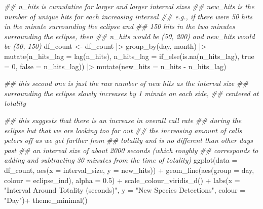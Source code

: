 \documentclass[
  letterpaper,
  DIV=11,
  numbers=noendperiod]{scrartcl}
\newenvironment{Shaded}{\begin{snugshade}}{\end{snugshade}}
\newcommand{\AttributeTok}[1]{\textcolor[rgb]{0.40,0.45,0.13}{#1}}
\newcommand{\DecValTok}[1]{\textcolor[rgb]{0.68,0.00,0.00}{#1}}
\newcommand{\DocumentationTok}[1]{\textcolor[rgb]{0.37,0.37,0.37}{\textit{#1}}}
\newcommand{\FloatTok}[1]{\textcolor[rgb]{0.68,0.00,0.00}{#1}}
\newcommand{\FunctionTok}[1]{\textcolor[rgb]{0.28,0.35,0.67}{#1}}
\newcommand{\NormalTok}[1]{\textcolor[rgb]{0.00,0.23,0.31}{#1}}
\newcommand{\OtherTok}[1]{\textcolor[rgb]{0.00,0.23,0.31}{#1}}
\newcommand{\SpecialCharTok}[1]{\textcolor[rgb]{0.37,0.37,0.37}{#1}}
\newcommand{\StringTok}[1]{\textcolor[rgb]{0.13,0.47,0.30}{#1}}
\begin{document}
\begin{Shaded}
\begin{Highlighting}[]
\DocumentationTok{\#\# n\_hits is cumulative for larger and larger interval sizes}
\DocumentationTok{\#\# new\_hits is the number of unique hits for each increasing interval }
\DocumentationTok{\#\# e.g., if there were 50 hits in the minute surrounding the eclipse and }
\DocumentationTok{\#\# 150 hits in the two minutes surrounding the eclipse, then}
\DocumentationTok{\#\# n\_hits would be (50, 200) and new\_hits would be (50, 150)}
\NormalTok{df\_count }\OtherTok{\textless{}{-}}\NormalTok{ df\_count }\SpecialCharTok{|\textgreater{}} \FunctionTok{group\_by}\NormalTok{(day, month) }\SpecialCharTok{|\textgreater{}}
  \FunctionTok{mutate}\NormalTok{(}\AttributeTok{n\_hits\_lag =} \FunctionTok{lag}\NormalTok{(n\_hits),}
         \AttributeTok{n\_hits\_lag =} \FunctionTok{if\_else}\NormalTok{(}\FunctionTok{is.na}\NormalTok{(n\_hits\_lag), }\AttributeTok{true =} \DecValTok{0}\NormalTok{, }\AttributeTok{false =}\NormalTok{ n\_hits\_lag)) }\SpecialCharTok{|\textgreater{}}
  \FunctionTok{mutate}\NormalTok{(}\AttributeTok{new\_hits =}\NormalTok{ n\_hits }\SpecialCharTok{{-}}\NormalTok{ n\_hits\_lag)}

\DocumentationTok{\#\# this second one is just the raw number of new hits as the interval size}
\DocumentationTok{\#\# surrounding the eclipse slowly increases by 1 minute on each side,}
\DocumentationTok{\#\# centered at totality}

\DocumentationTok{\#\# this suggests that there is an increase in overall call rate}
\DocumentationTok{\#\# during the eclipse but that we are looking too far out}
\DocumentationTok{\#\# the increasing amount of calls peters off as we get further from }
\DocumentationTok{\#\# totality and is no different than other days past}
\DocumentationTok{\#\# an interval size of about 2000 seconds (which roughly }
\DocumentationTok{\#\# corresponds to adding and subtracting 30 minutes from the time of totality)}
\FunctionTok{ggplot}\NormalTok{(}\AttributeTok{data =}\NormalTok{ df\_count, }\FunctionTok{aes}\NormalTok{(}\AttributeTok{x =}\NormalTok{ interval\_size, }\AttributeTok{y =}\NormalTok{ new\_hits)) }\SpecialCharTok{+}
  \FunctionTok{geom\_line}\NormalTok{(}\FunctionTok{aes}\NormalTok{(}\AttributeTok{group =}\NormalTok{ day, }\AttributeTok{colour =}\NormalTok{ eclipse\_ind), }\AttributeTok{alpha =} \FloatTok{0.5}\NormalTok{) }\SpecialCharTok{+}
  \FunctionTok{scale\_colour\_viridis\_d}\NormalTok{() }\SpecialCharTok{+}
  \FunctionTok{labs}\NormalTok{(}\AttributeTok{x =} \StringTok{"Interval Around Totality (seconds)"}\NormalTok{,}
  \AttributeTok{y =} \StringTok{"New Species Detections"}\NormalTok{,}
  \AttributeTok{colour =} \StringTok{"Day"}\NormalTok{)}\SpecialCharTok{+}
  \FunctionTok{theme\_minimal}\NormalTok{()}
\end{Highlighting}
\end{Shaded}
\end{document}
